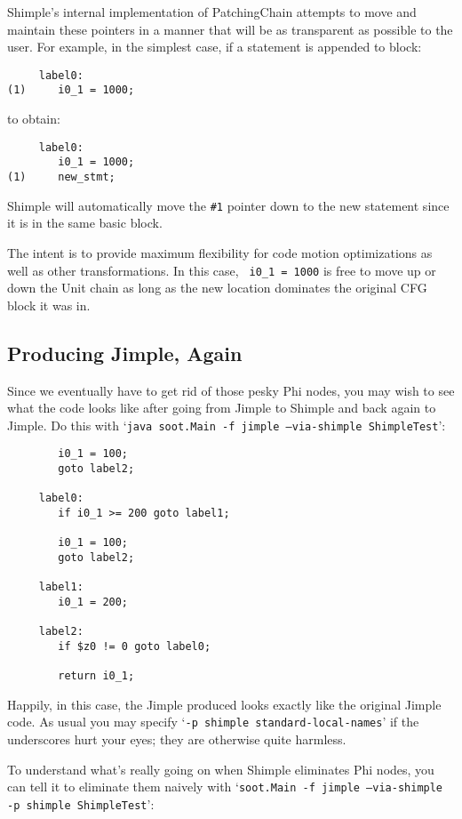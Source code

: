\documentclass[10pt,letterpaper,oneside,onecolumn]{article}
\begin{document}
Shimple's internal implementation of PatchingChain attempts to move
and maintain these pointers in a manner that will be as transparent as
possible to the user.  For example, in the simplest case, if a
statement is appended to block:

\begin{verbatim}
     label0:
(1)     i0_1 = 1000;
\end{verbatim}

to obtain:

\begin{verbatim}
     label0:
        i0_1 = 1000;
(1)     new_stmt;
\end{verbatim}

Shimple will automatically move the {\tt \#1} pointer down to the new
statement since it is in the same basic block.

The intent is to provide maximum flexibility for code motion
optimizations as well as other transformations.  In this case, {\tt
i0\_1 = 1000} is free to move up or down the Unit chain as long as the
new location dominates the original CFG block it was in.

\subsection{Producing Jimple, Again}

Since we eventually have to get rid of those pesky Phi nodes, you
may wish to see what the code looks like after going from Jimple to
Shimple and back again to Jimple.  Do this with `{\tt java soot.Main -f
jimple --via-shimple ShimpleTest}':

\begin{verbatim}
        i0_1 = 100;
        goto label2;

     label0:
        if i0_1 >= 200 goto label1;

        i0_1 = 100;
        goto label2;

     label1:
        i0_1 = 200;

     label2:
        if $z0 != 0 goto label0;

        return i0_1;
\end{verbatim}

Happily, in this case, the Jimple produced looks exactly like the
original Jimple code.  As usual you may specify `{\tt -p shimple
standard-local-names}' if the underscores hurt your eyes; they are
otherwise quite harmless.

To understand what's really going on when Shimple eliminates Phi
nodes, you can tell it to eliminate them naively with `{\tt soot.Main
-f jimple --via-shimple -p shimple ShimpleTest}':
\end{document}
